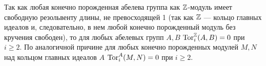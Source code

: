     Так как любая конечно порожденная абелева группа как $\mathbb{Z}$-модуль имеет свободную резольвенту
    длины, не превосходящей 1 (так как $\mathbb{Z}$ --- кольцо главных идеалов и, следовательно, в нем 
    любой конечно порожденный модуль без кручения свободен), то для любых абелевых групп $A, B$ 
    $\textup{Tor}_i^{\mathbb{Z}}(A, B) = 0$ при $i \ge 2$. По аналогичной причине для любых конечно порожденных 
    модулей $M, N$ над кольцом главных идеалов $A$ $\textup{Tor}_i^{A}(M, N) = 0$ при $i \ge 2$.